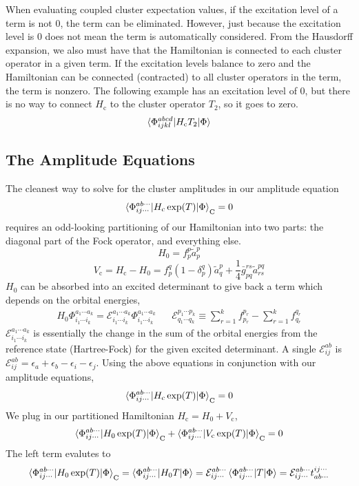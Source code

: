 \documentclass{article}
\newcommand{\cd}{\cdots}
\newcommand{\Vc}{V_{\mathrm{c}}}
\newcommand{\Hc}{H_{\mathrm{c}}}
\begin{document}
When evaluating coupled cluster expectation values, if the excitation level 
of a term is not 0, the term can be eliminated.
However, just because the excitation level is 0 does not mean the term is automatically considered.
From the Hausdorff expansion, we also must have that the Hamiltonian is connected to each
cluster operator in a given term. If the excitation levels balance to zero and the Hamiltonian
can be connected (contracted) to all cluster operators in the term, the term is nonzero.
The following example has an excitation level of 0, but there is no way to connect $\Hc$ to the cluster
operator $T_2$, so it goes to zero.
\[\braket{\Phi_{ijkl}^{abcd}| \Hc T_2 | \Phi } \]

\subsection{The Amplitude Equations}
The cleanest way to solve for the cluster amplitudes 
in our amplitude equation 
\[\braket{ \Phi_{i j \cdots }^{a b \cdots} |\Hc \exp(T) | \Phi}_\mathrm{C} = 0\]
requires an odd-looking partitioning of our Hamiltonian 
into two parts: the diagonal part of the Fock operator, and everything else. 
\[H_0 = f_p^p \tilde{a}_p^p \]
\[\Vc = \Hc - H_0 = f_p^q (1 - \delta_p^q) \tilde{a}_q^p + \frac{1}{4} \bar{g}_{pq}^{rs}
 \tilde{a}_{rs}^{pq} \]
$H_0$ can be absorbed into an excited determinant to give back
a term which depends on the orbital energies,
\begin{align}
  H_0\Phi_{i_1\cd i_k}^{a_1\cd a_k}
=
  \mathcal{E}_{i_1\cd i_k}^{a_1\cd a_k}
  \Phi_{i_1\cd i_k}^{a_1\cd a_k}
&&
  \mathcal{E}_{q_1\cd q_k}^{p_1\cd p_k}
\equiv
  \sum_{r=1}^k
  f_{p_r}^{p_r}
-
  \sum_{r=1}^k
  f_{q_r}^{q_r}
\end{align}
$\mathcal{E}_{i_1\cd i_k}^{a_1\cd a_k}$ is essentially the change 
in the sum of the orbital energies from the reference state (Hartree-Fock) for the given 
excited determinant. A single  
$\mathcal{E}_{ij}^{ab}$ is $\mathcal{E}_{ij}^{ab} = \epsilon_a + \epsilon_b - \epsilon_i - \epsilon_j$. 
Using the above equations in conjunction with our amplitude equations,
\[\braket{ \Phi_{i j \cdots }^{a b \cdots} |\Hc \exp(T) | \Phi}_\mathrm{C} 
   =  0  \]
We plug in our partitioned Hamiltonian $\Hc = H_0 + \Vc$,
\[\braket{ \Phi_{i j \cdots }^{a b \cdots} |H_0 \exp(T) | \Phi}_\mathrm{C} 
 + \braket{ \Phi_{i j \cdots }^{a b \cdots} |\Vc \exp(T) | \Phi}_\mathrm{C}
   =  0  \]
The left term evalutes to 
\[ \braket{ \Phi_{i j \cdots }^{a b \cdots} |H_0 \exp(T) | \Phi}_\mathrm{C} = 
   \braket{ \Phi_{i j \cdots }^{a b \cdots} |H_0 T | \Phi} = 
\mathcal{E}_{ij \cd}^{ab \cd} \braket{\Phi_{i j \cdots }^{a b \cdots} |T|\Phi} =
\mathcal{E}_{ij \cd}^{ab \cd} t_{ab \cd}^{ij \cd} \]
\end{document}
